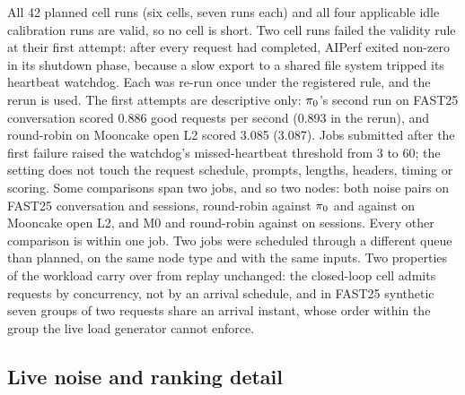 All 42 planned cell runs (six cells, seven runs each) and all four applicable idle calibration runs
are valid, so no cell is short. Two cell runs failed the validity rule at their first attempt: after
every request had completed, AIPerf exited non-zero in its shutdown phase, because a slow export to a
shared file system tripped its heartbeat watchdog. Each was re-run once under the registered rule, and
the rerun is used. The first attempts are descriptive only: $\pi_{0}$'s second run on FAST25
conversation scored 0.886 good requests per second (0.893 in the rerun), and round-robin on Mooncake
open L2 scored 3.085 (3.087). Jobs submitted after the first failure raised the watchdog's
missed-heartbeat threshold from 3 to 60; the setting does not touch the request schedule, prompts,
lengths, headers, timing or scoring.
Some comparisons span two jobs, and so two nodes: both noise pairs on FAST25 conversation and sessions,
round-robin against $\pi_{0}$ and against  on Mooncake open L2, and M0 and round-robin
against  on sessions. Every other comparison is within one job. Two jobs were scheduled
through a different queue than planned, on the same node type and with the same inputs. Two
properties of the workload carry over from replay unchanged: the closed-loop cell admits requests by
concurrency, not by an arrival schedule, and in FAST25 synthetic seven groups of two requests share
an arrival instant, whose order within the group the live load generator cannot enforce.

\subsection{Live noise and ranking detail}

